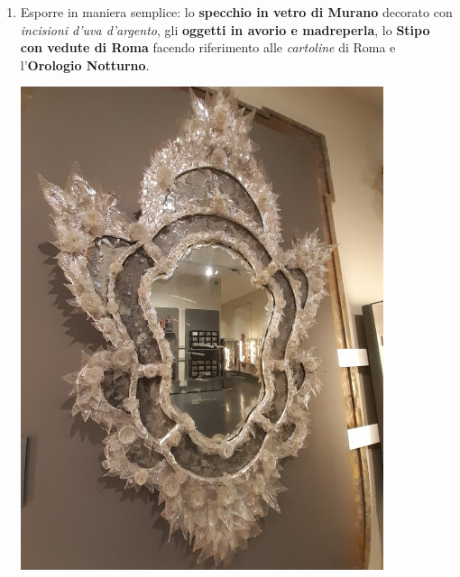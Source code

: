 \documentclass[12pt,a4paper]{article}
\begin{document}
\begin{enumerate}
	\item Esporre in maniera semplice: lo \textbf{specchio in vetro di Murano} decorato con \textit{incisioni d'uva d'argento},  gli \textbf{oggetti in avorio e madreperla}, lo \textbf{Stipo con vedute di Roma} facendo riferimento alle \textit{cartoline} di Roma e l'\textbf{Orologio Notturno}.\par
	\begin{minipage}{\linewidth}
		\centering
		\begin{minipage}{0.4\linewidth}
			\includegraphics[scale=1.3]{Specchio_Murano.jpg}
		\end{minipage}
		\hfill
		\begin{minipage}{0.4\linewidth}

\end{minipage}
\end{minipage}
\end{enumerate}
\end{document}

